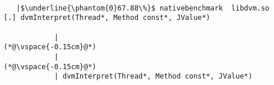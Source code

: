
\begin{lstlisting}[caption=Staattinen metodi Java$\to$C , label=profile:J2CBenchmark00001, numberbychapter=true, frame=lines, float, floatplacement=t]

   |$\underline{\phantom{0}67.88\%}$ nativebenchmark  libdvm.so           [.] dvmInterpret(Thread*, Method const*, JValue*)

            |
(*@\vspace{-0.15cm}@*)
            |
(*@\vspace{-0.15cm}@*)
            | dvmInterpret(Thread*, Method const*, JValue*)


\end{lstlisting}
